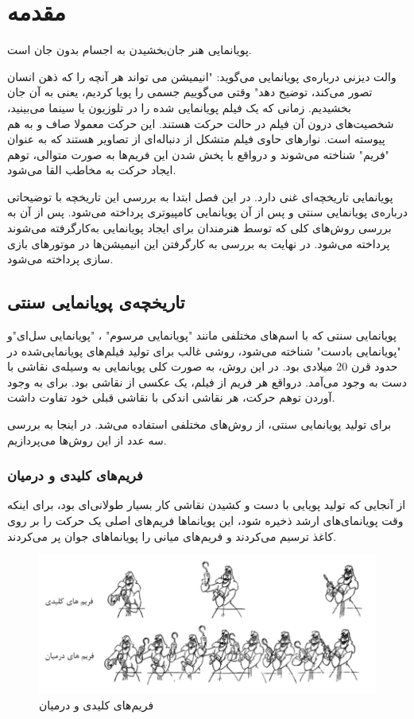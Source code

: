 \chapter{مقدمه}
پویانمایی هنر جان‌بخشیدن به اجسام بدون جان است.

والت دیزنی درباره‌‌ی پویانمایی می‌گوید: "انیمیشن می تواند هر آنچه را که ذهن انسان تصور می‌کند، توضیح دهد"
وقتی می‌گوییم جسمی را پویا کردیم، یعنی به آن جان بخشیدیم.
زمانی که یک فیلم پویانمایی شده را در تلوزیون یا سینما می‌بینید، شخصیت‌های درون آن فیلم در حالت حرکت هستند.
این حرکت معمولا صاف و به هم پیوسته است. نوارهای حاوی فیلم متشکل از دنباله‌ای از تصاویر هستند که به عنوان "فریم" شناخته می‌شوند و درواقع با پخش شدن این فریم‌ها
به صورت متوالی، توهم ایجاد حرکت به مخاطب القا می‌شود.

پویانمایی تاریخچه‌ای غنی‌ دارد. در این فصل ابتدا به بررسی این تاریخچه با توضیحاتی 
درباره‌ی پویانمایی سنتی و پس از آن پویانمایی کامپیوتری پرداخته می‌شود.
پس از آن به بررسی روش‌های کلی که توسط هنرمندان برای ایجاد پویانمایی به‌کارگرفته می‌شوند پرداخته می‌شود.
در نهایت به بررسی به کارگرفتن این انیمیشن‌ها در موتورهای بازی سازی پرداخته می‌شود.

\section{تاریخچه‌ی پویانمایی سنتی}

پویانمایی سنتی که با اسم‌های مختلفی مانند "پویانمایی مرسوم" ، "پویانمایی سل‌ای"و "پویانمایی بادست" شناخته می‌شود، روشی 
غالب برای تولید فیلم‌های پویانمایی‌شده در حدود قرن 20 میلادی بود.
در این روش، به صورت کلی پویانمایی به وسیله‌ی نقاشی با دست به وجود می‌‌آمد.
درواقع هر فریم از فیلم، یک عکسی از نقاشی بود.
برای به وجود آوردن توهم حرکت، هر نقاشی اندکی با نقاشی قبلی خود تفاوت داشت.

برای تولید پویانمایی سنتی، از روش‌های مختلفی استفاده می‌شد. در اینجا به بررسی
سه عدد از این روش‌ها می‌پردازیم.

\subsection{فریم‌های کلیدی و درمیان}
از آنجایی که تولید پویایی با دست و کشیدن نقاشی کار بسیار طولانی‌ای بود، برای اینکه وقت پویانمای‌های ارشد 
ذخیره شود، این پویانماها فریم‌های اصلی یک حرکت را بر روی کاغذ ترسیم می‌کردند و 
فریم‌های میانی را پویانماهای جوان پر می‌کردند.

\begin{figure}[ht]
	\centerline{\includegraphics[width=\textwidth,height=\textheight,keepaspectratio]{Figures/Ch1/KeyframeAnimation.png}}

	\caption{فریم‌های کلیدی و درمیان}
	\label{fig:KeyframeAnimation}
\end{figure}

